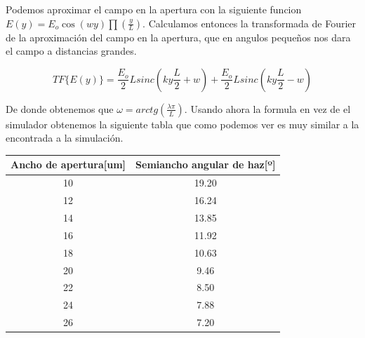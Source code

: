 \documentclass[12pt, a4papre]{article}
\begin{document}
	Podemos aproximar el campo en la apertura con la siguiente funcion $E(y) = E_o \cos(wy)\prod\left(\frac{y}{L}\right)$. Calculamos entonces la transformada de Fourier de la aproximación del campo en la apertura, que en angulos pequeños nos dara el campo a distancias grandes.
	
	\[
		TF\{E(y)\} = \frac{E_o}{2}Lsinc(ky\frac{L}{2}+w)+\frac{E_o}{2}Lsinc(ky\frac{L}{2}-w)
	\]
	
	De donde obtenemos que $\omega = arctg\left(\frac{\lambda \pi}{L}\right)$. Usando ahora la formula en vez de el simulador obtenemos la siguiente tabla que como podemos ver es muy similar a la encontrada a la simulación.
	\begin{center}
		\begin{tabular}{ ||c|c|| } 
			\hline
			Ancho de apertura[um]& Semiancho angular de haz[º]\\ 
			\hline
			10 & 19.20\\ 
			12 & 16.24\\ 
			14 & 13.85\\ 
			16 & 11.92\\ 
			18 & 10.63\\ 
			20 & 9.46\\ 
			22 & 8.50\\ 
			24 & 7.88\\ 
			26 & 7.20\\ 
			\hline
		\end{tabular}
	\end{center}
	
\end{document}
